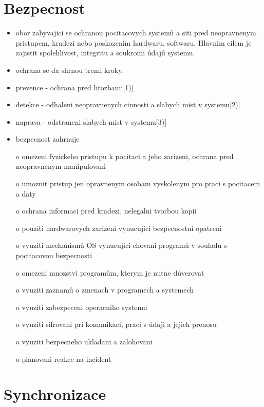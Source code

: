 \documentclass[a4paper,12pt]{article}
\begin{document}
\section{Bezpecnost}
    \begin{itemize}
        \item{obor zabyvajici se ochranou pocitacovych systemů a siti pred neopravnenym pristupem, kradezi nebo poskozenim hardwaru, softwaru. Hlavnim cilem je zajistit spolehlivost, integritu a soukromi údajů systemu.}
        \item{ochrana se da shrnou tremi kroky:}
            \item{prevence - ochrana pred hrozbami}[1)]
            \item{detekce - odhaleni neopravnenych cinnosti a slabych mist v systemu}[2)]
            \item{naprava - odstraneni slabych mist v systemu}[3)]
        \item{bezpecnost zahrnuje}
            \item[o]{omezeni fyzickeho pristupu k pocitaci a jeho zarizeni, ochrana pred neopravnenym manipulovani}
            \item[o]{umoznit pristup jen opravnenym osobam vyskolenym pro praci s pocitacem a daty}
            \item[o]{ochrana informaci pred kradezi, nelegalni tvorbou kopii}
            \item[o]{pouziti hardwarovych zarizeni vynucujici bezpecnostni opatreni}
            \item[o]{vyuziti mechanismů OS vynucujici chovani programů v souladu s pocitacovou bezpecnosti}
            \item[o]{omezeni mnozstvi programům, kterym je nutne důverovat}
            \item[o]{vyuziti zaznamů o zmenach v programech a systemech}
            \item[o]{vyuziti zabezpeceni operacniho systemu}
            \item[o]{vyuziti sifrovani pri komunikaci, praci s údaji a jejich prenosu}
            \item[o]{vyuziti bezpecneho ukladani a zalohovani}
            \item[o]{planovani reakce na incident}
    \end{itemize}

\section{Synchronizace}
\end{document}
